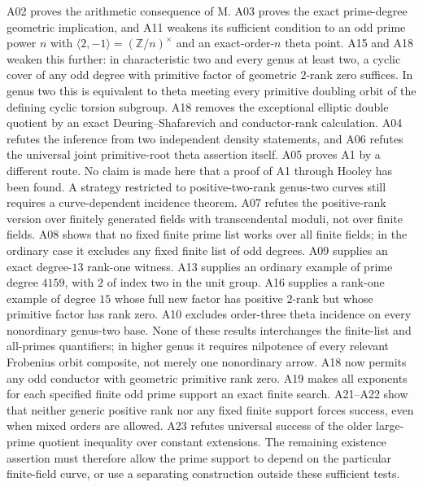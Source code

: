 A02 proves the arithmetic consequence of M. A03 proves the exact
prime-degree geometric implication, and A11 weakens its sufficient
condition to an odd prime power $n$ with
$\langle2,-1\rangle=(\mathbb Z/n)^\times$ and an exact-order-$n$
theta point. A15 and A18 weaken this further: in characteristic two and every
genus at least two, a cyclic cover of any odd degree with primitive
factor of geometric $2$-rank zero suffices. In genus two this is
equivalent to theta meeting every primitive doubling orbit of the
defining cyclic torsion subgroup. A18 removes the exceptional
elliptic double quotient by an exact Deuring--Shafarevich and
conductor-rank calculation.
A04 refutes the inference from
two independent density statements, and A06 refutes the universal
joint primitive-root theta assertion itself. A05 proves A1 by a
different route. No claim is made here that a proof of A1 through
Hooley has been found. A strategy restricted to positive-two-rank
genus-two curves still requires a curve-dependent incidence theorem.
A07 refutes the positive-rank version over finitely generated fields
with transcendental moduli, not over finite fields. A08 shows that
no fixed finite prime list works over all finite fields; in the
ordinary case it excludes any fixed finite list of odd degrees.
A09 supplies an exact degree-$13$ rank-one witness. A13 supplies an
ordinary example of prime degree $4159$, with $2$ of index two in
the unit group. A16 supplies a rank-one example of degree $15$
whose full new factor has positive $2$-rank but whose primitive
factor has rank zero. A10 excludes order-three theta incidence on every nonordinary
genus-two base. None of
these results interchanges the finite-list and all-primes quantifiers;
in higher genus it requires nilpotence of every relevant Frobenius
orbit composite, not merely one nonordinary arrow.
A18 now permits any odd conductor with geometric primitive rank zero.
A19 makes all exponents for each specified finite odd prime support
an exact finite search. A21--A22 show that neither generic
positive rank nor any fixed finite support forces success, even
when mixed orders are allowed. A23 refutes universal success of
the older large-prime quotient inequality over constant extensions.
The remaining existence assertion must therefore allow the prime
support to depend on the particular finite-field curve, or use a
separating construction outside these sufficient tests.

